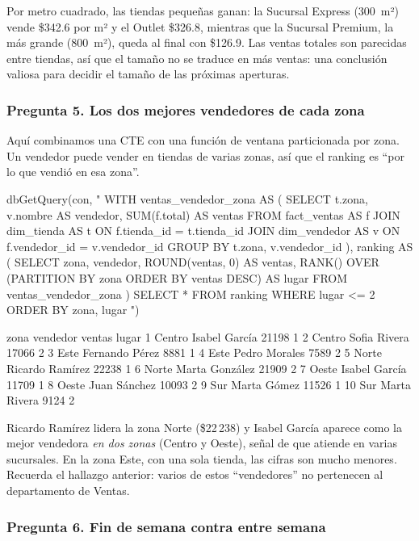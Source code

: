 Por metro cuadrado, las tiendas pequeñas ganan: la Sucursal Express
(300~m²) vende \$342.6 por m² y el Outlet \$326.8, mientras que la Sucursal
Premium, la más grande (800~m²), queda al final con \$126.9. Las ventas
totales son parecidas entre tiendas, así que el tamaño no se traduce en más
ventas: una conclusión valiosa para decidir el tamaño de las próximas
aperturas.

\subsubsection{Pregunta 5. Los dos mejores vendedores de cada zona}

Aquí combinamos una CTE con una función de ventana particionada por zona.
Un vendedor puede vender en tiendas de varias zonas, así que el ranking es
``por lo que vendió en esa zona''.

\begin{rcode}
dbGetQuery(con, "
  WITH ventas_vendedor_zona AS (
    SELECT t.zona, v.nombre AS vendedor, SUM(f.total) AS ventas
    FROM fact_ventas AS f
    JOIN dim_tienda   AS t ON f.tienda_id   = t.tienda_id
    JOIN dim_vendedor AS v ON f.vendedor_id = v.vendedor_id
    GROUP BY t.zona, v.vendedor_id
  ),
  ranking AS (
    SELECT zona, vendedor, ROUND(ventas, 0) AS ventas,
           RANK() OVER (PARTITION BY zona ORDER BY ventas DESC) AS lugar
    FROM ventas_vendedor_zona
  )
  SELECT * FROM ranking
  WHERE lugar <= 2
  ORDER BY zona, lugar
")
\end{rcode}

\begin{rsalida}
     zona        vendedor ventas lugar
1  Centro   Isabel García  21198     1
2  Centro    Sofia Rivera  17066     2
3    Este  Fernando Pérez   8881     1
4    Este   Pedro Morales   7589     2
5   Norte Ricardo Ramírez  22238     1
6   Norte  Marta González  21909     2
7   Oeste   Isabel García  11709     1
8   Oeste    Juan Sánchez  10093     2
9     Sur     Marta Gómez  11526     1
10    Sur    Marta Rivera   9124     2
\end{rsalida}

Ricardo Ramírez lidera la zona Norte (\$22\,238) y Isabel García aparece
como la mejor vendedora \emph{en dos zonas} (Centro y Oeste), señal de que
atiende en varias sucursales. En la zona Este, con una sola tienda, las
cifras son mucho menores. Recuerda el hallazgo anterior: varios de estos
``vendedores'' no pertenecen al departamento de Ventas.

\subsubsection{Pregunta 6. Fin de semana contra entre semana}

